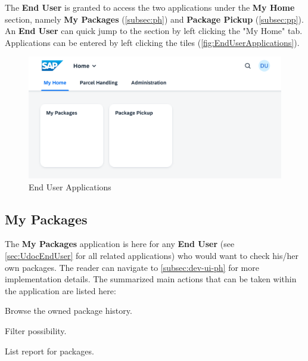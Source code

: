 The \textbf{End User} is granted to access the two applications under the \textbf{My Home} section, namely \textbf{My Packages} (\autoref{subsec:ph}) and \textbf{Package Pickup} (\autoref{subsec:pp}). An \textbf{End User} can quick jump to the section by left clicking the "My Home" tab. Applications can be entered by left clicking the tiles (\autoref{fig:EndUserApplications}).

\begin{figure}[H]
	\centering
	\includegraphics[width=1\linewidth]{images/user_doc/overviews/MyHomeTab.png}
	\caption{End User Applications}
	\label{fig:EndUserApplications}
\end{figure}


% 

\subsection{My Packages}
\label{subsec:ph}

The \textbf{My Packages} application is here for any \textbf{End User} (see \autoref{sec:UdocEndUser} for all related applications) who would want to check his/her own packages. The reader can navigate to \autoref{subsec:dev-ui-ph} for more implementation details.
The summarized main actions that can be taken within the application are listed here:

\begin{compactenum}
	\item Browse the owned package history.
        \begin{compactenum}
        	\item Filter possibility.
            \item List report for packages.
        \end{compactenum}
\end{compactenum}

